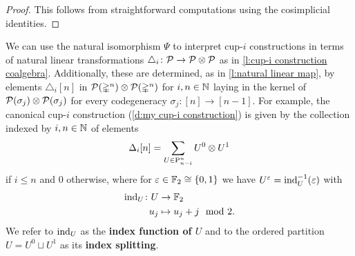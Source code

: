 \begin{proof}
	This follows from straightforward computations using the cosimplicial identities.
\end{proof}

%

We can use the natural isomorphism $\Psi$ to interpret cup-$i$ constructions in terms of natural linear transformations $\triangle_i \colon \mathcal{P} \to \mathcal{P} \otimes \mathcal{P}$ as in \cref{l:cup-i construction coalgebra}.
Additionally, these are determined, as in \cref{l:natural linear map}, by elements $\triangle_i[n]$ in $\mathcal{P}(\mathbb{\Delta}^n) \otimes \mathcal{P}(\mathbb{\Delta}^n)$ for $i, n \in \mathbb{N}$ laying in the kernel of $\mathcal{P}(\sigma_j) \otimes \mathcal{P}(\sigma_j)$ for every codegeneracy $\sigma_j \colon [n] \to [n-1]$.
For example, the canonical cup-$i$ construction (\cref{d:my cup-i construction}) is given by the collection indexed by $i, n \in \mathbb{N}$ of elements
\[
\Delta_i[n] = \sum_{U \in \mathrm{P}^n_{n-i}} U^0 \otimes U^1
\]
if $i \leq n$ and $0$ otherwise, where for $\varepsilon \in {\mathbb{F}_2} \cong \{0,1\}$ we have $U^\varepsilon = \operatorname{ind}_U^{-1}(\varepsilon)$ with
\[
\begin{split}
\operatorname{ind}_U \colon U &\to {\mathbb{F}_2} \\
u_j &\mapsto u_j + j \mod 2.
\end{split}
\]
We refer to $\operatorname{ind}_U$ as the \textbf{index function of $U$} and to the ordered partition $U = U^0 \sqcup U^1$ as its \textbf{index splitting}.


